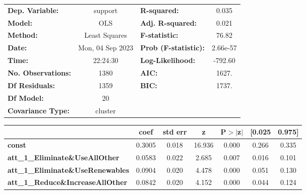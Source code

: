 \begin{center}
\begin{tabular}{lclc}
\toprule
\textbf{Dep. Variable:}                     &     support      & \textbf{  R-squared:         } &     0.035   \\
\textbf{Model:}                             &       OLS        & \textbf{  Adj. R-squared:    } &     0.021   \\
\textbf{Method:}                            &  Least Squares   & \textbf{  F-statistic:       } &     76.82   \\
\textbf{Date:}                              & Mon, 04 Sep 2023 & \textbf{  Prob (F-statistic):} &  2.66e-57   \\
\textbf{Time:}                              &     22:24:30     & \textbf{  Log-Likelihood:    } &   -792.60   \\
\textbf{No. Observations:}                  &        1380      & \textbf{  AIC:               } &     1627.   \\
\textbf{Df Residuals:}                      &        1359      & \textbf{  BIC:               } &     1737.   \\
\textbf{Df Model:}                          &          20      & \textbf{                     } &             \\
\textbf{Covariance Type:}                   &     cluster      & \textbf{                     } &             \\
\bottomrule
\end{tabular}
\begin{tabular}{lcccccc}
                                            & \textbf{coef} & \textbf{std err} & \textbf{z} & \textbf{P$> |$z$|$} & \textbf{[0.025} & \textbf{0.975]}  \\
\midrule
\textbf{const}                              &       0.3005  &        0.018     &    16.936  &         0.000        &        0.266    &        0.335     \\
\textbf{att\_1\_Eliminate\&UseAllOther}     &       0.0583  &        0.022     &     2.685  &         0.007        &        0.016    &        0.101     \\
\textbf{att\_1\_Eliminate\&UseRenewables}   &       0.0904  &        0.020     &     4.478  &         0.000        &        0.051    &        0.130     \\
\textbf{att\_1\_Reduce\&IncreaseAllOther}   &       0.0842  &        0.020     &     4.152  &         0.000        &        0.044    &        0.124     \\

\end{tabular}
\end{center}
